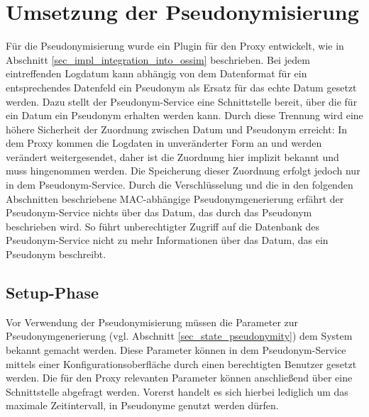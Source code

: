 \section{Umsetzung der Pseudonymisierung} %

\label{sec_impl_pseudonymity}





Für die Pseudonymisierung wurde ein Plugin für den Proxy entwickelt, wie in Abschnitt \ref{sec_impl_integration_into_ossim} beschrieben. Bei jedem eintreffenden Logdatum kann abhängig von dem Datenformat für ein entsprechendes Datenfeld ein Pseudonym als Ersatz für das echte Datum gesetzt werden. Dazu stellt der Pseudonym-Service eine Schnittstelle bereit, über die für ein Datum ein Pseudonym erhalten werden kann. Durch diese Trennung wird eine höhere Sicherheit der Zuordnung zwischen Datum und Pseudonym erreicht: In dem Proxy kommen die Logdaten in unveränderter Form an und werden verändert weitergesendet, daher ist die Zuordnung hier implizit bekannt und muss hingenommen werden. Die Speicherung dieser Zuordnung erfolgt jedoch nur in dem Pseudonym-Service. Durch die Verschlüsselung und die in den folgenden Abschnitten beschriebene MAC-abhängige Pseudonymgenerierung erfährt der Pseudonym-Service nichts über das Datum, das durch das Pseudonym beschrieben wird. So führt unberechtigter Zugriff auf die Datenbank des Pseudonym-Service nicht zu mehr Informationen über das Datum, das ein Pseudonym beschreibt.

\subsection{Setup-Phase}

Vor Verwendung der Pseudonymisierung müssen die Parameter zur Pseudonymgenerierung (vgl. Abschnitt \ref{sec_state_pseudonymity}) dem System bekannt gemacht werden. Diese Parameter können in dem Pseudonym-Service mittels einer Konfigurationsoberfläche durch einen berechtigten Benutzer gesetzt werden. Die für den Proxy relevanten Parameter können anschließend über eine Schnittstelle abgefragt werden. Vorerst handelt es sich hierbei lediglich um das maximale Zeitintervall, in Pseudonyme genutzt werden dürfen.

